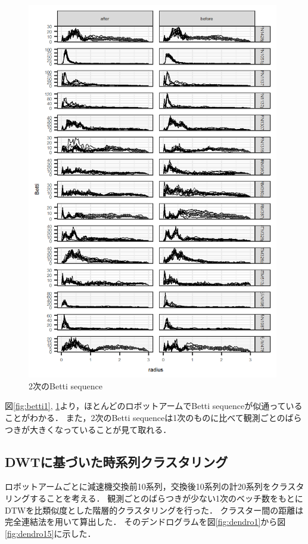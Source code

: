 \documentclass{jarticle}
\begin{document}
\begin{figure}[htbp]
\begin{center}
	\includegraphics[width=11cm]{fig/betti_2.png}	
	\caption{2次のBetti sequence}\label{fig:betti2}
\end{center}
\end{figure}

図\ref{fig:betti1}, \ref{fig:betti2}より，ほとんどのロボットアームでBetti sequenceが似通っていることがわかる．
また，2次のBetti sequenceは1次のものに比べて観測ごとのばらつきが大きくなっていることが見て取れる．

\subsection{DWTに基づいた時系列クラスタリング}

ロボットアームごとに減速機交換前10系列，交換後10系列の計20系列をクラスタリングすることを考える．
観測ごとのばらつきが少ない1次のベッチ数をもとにDTWを比類似度とした階層的クラスタリングを行った．
クラスター間の距離は完全連結法を用いて算出した．
そのデンドログラムを図\ref{fig:dendro1}から図\ref{fig:dendro15}に示した．
\end{document}
